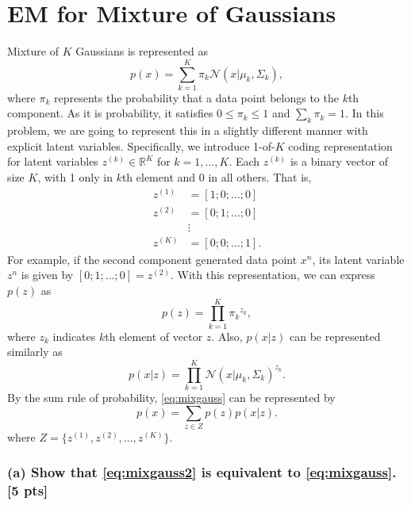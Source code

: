 \documentclass[twoside,10pt]{article}
\begin{document}
\section{EM for Mixture of Gaussians}
Mixture of $K$ Gaussians is represented as
\begin{equation}
p(x) = \sum_{k=1}^K \pi_k \mathcal{N}(x|\mu_k,
\Sigma_k),\label{eq:mixgauss}
\end{equation}
where $\pi_k$ represents the probability that a data point belongs
to the $k$th component. As it is probability, it satisfies $0 \le
\pi_k \le 1$ and $\sum_k \pi_k = 1$. In this problem, we are going
to represent this in a slightly different manner with explicit
latent variables. Specifically, we introduce 1-of-$K$ coding
representation for latent variables $z^{(k)} \in \mathbb{R}^K$ for
$k = 1, ..., K$. Each $z^{(k)}$ is a binary vector of size $K$, with
1 only in $k$th element and 0 in all others. That is,
\begin{align}
z^{(1)} &= [1; 0; ... ; 0]\nonumber\\
z^{(2)} &= [0; 1; ... ; 0]\nonumber\\
&\vdots\nonumber\\ z^{(K)} &= [0; 0; ... ; 1]\nonumber.
\end{align}
For example, if the second component generated data point $x^n$, its
latent variable $z^n$ is given by $[0; 1; ... ; 0] = z^{(2)}$. With
this representation, we can express $p(z)$ as
\begin{equation}
p(z) = \prod_{k=1}^K {\pi_k}^{z_k},\nonumber
\end{equation}
where $z_k$ indicates $k$th element of vector $z$. Also, $p(x|z)$
can be represented similarly as
\begin{equation}
p(x|z) = \prod_{k=1}^K \mathcal{N}(x|\mu_k,
\Sigma_k)^{z_k}.\nonumber
\end{equation}
By the sum rule of probability, \eqref{eq:mixgauss} can be
represented by
\begin{equation}
p(x) = \sum_{z \in Z} p(z) p(x|z).\label{eq:mixgauss2}
\end{equation}
where $Z = \{z^{(1)}, z^{(2)}, ..., z^{(K)}\}$.

\subsubsection*{(a) Show that \eqref{eq:mixgauss2} is equivalent to
\eqref{eq:mixgauss}. [5 pts]}
\end{document}
